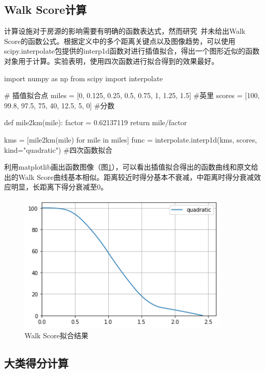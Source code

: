 \documentclass{article}
\begin{document}
\subsection{Walk Score计算}
计算设施对于房源的影响需要有明确的函数表达式，然而研究~\cite{walk}并未给出Walk Score的函数公式。根据定义中的多个距离关键点以及图像趋势，可以使用scipy.interpolate包提供的interp1d函数对进行插值拟合，得出一个图形近似的函数对象用于计算。实验表明，使用四次函数进行拟合得到的效果最好。

\begin{python}
import numpy as np
from scipy import interpolate

# 插值拟合点
miles = [0, 0.125, 0.25, 0.5, 0.75, 1, 1.25, 1.5] #英里
scores = [100, 99.8, 97.5, 75, 40, 12.5, 5, 0] #分数

def mile2km(mile):
    factor = 0.62137119
    return mile/factor

kms = [mile2km(mile) for mile in miles]
func = interpolate.interp1d(kms, scores, kind="quadratic") #四次函数拟合
\end{python}

利用matplotlib画出函数图像（图\ref{拟合结果}），可以看出插值拟合得出的函数曲线和原文给出的Walk Score曲线基本相似。距离较近时得分基本不衰减，中距离时得分衰减效应明显，长距离下得分衰减至0。

\begin{figure}[htbp]
\centering
\includegraphics[width=0.9\textwidth]{./pic/拟合结果.png}
\caption{Walk Score拟合结果}
\label{拟合结果}
\end{figure}

\subsection{大类得分计算}
\end{document}
